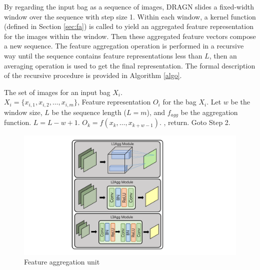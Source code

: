 \documentclass[10pt,twocolumn,letterpaper]{article}
\begin{document}
By regarding the input bag as a sequence of images, DRAGN slides a fixed-width window over the sequence with step size 1. Within each window, a kernel function (defined in Section \ref{sec:fa}) is called to yield an aggregated feature representation for the images within the window. Then these aggregated feature vectors compose a new sequence. The feature aggregation operation is performed in a recursive way until the sequence contains feature representations less than $L$, then an averaging operation is used to get the final representation. The formal description of the recursive procedure is provided in Algorithm \ref{algo}.


\renewcommand{\algorithmicrequire}{ \textbf{Input:}}      %
\renewcommand{\algorithmicensure}{ \textbf{Output:}}     %

\begin{algorithm}
  \caption{ } \label{algo}
  \label{alg:Framwork}
  \begin{algorithmic}[1]
     \REQUIRE
The set of images for an input bag $X_i$. \\
$X_i=\{x_{i,1}, x_{i,2}, \ldots, x_{i,m}\}$,
\ENSURE
Feature representation $O_i$ for the bag $X_i$.
\STATE Let $w$ be the window size, $L$ be the sequence length ($L = m$), and $f_{agg}$ be the aggregation function.
\STATE $L = L-w+1$.
\STATE $O_k = f(x_k, \ldots, x_{k+w-1})$.
\ENDFOR
{}
, return.
\ENDIF
\STATE Goto  Step 2.
 \end{algorithmic}
\end{algorithm}


\begin{figure}[t]
\begin{center}
  \includegraphics[width=0.8\linewidth]{aggregationUnit.pdf}
\end{center}
   \caption{Feature aggregation unit}
\label{fig:long}
\label{fig:units}
\end{figure}
\end{document}
